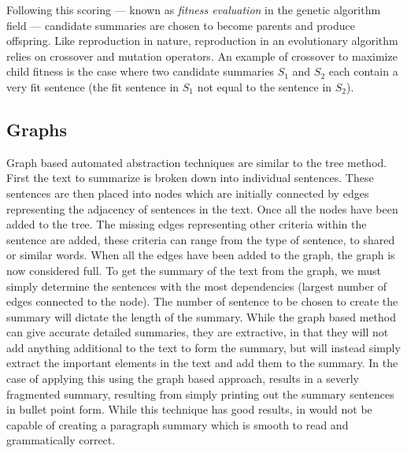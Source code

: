 Following this scoring --- known as {\em fitness evaluation} in the genetic algorithm field --- candidate summaries are chosen to become parents and produce offspring. Like reproduction in nature, reproduction in an evolutionary algorithm relies on crossover and mutation operators. An example of crossover to maximize child fitness is the case where two candidate summaries $S_1$ and $S_2$ each contain a very fit sentence (the fit sentence in $S_1$ not equal to the sentence in $S_2$).


\subsection{Graphs}
Graph based automated abstraction techniques are similar to the tree method. First the text to summarize is broken down into individual sentences. These sentences are then placed into nodes which are initially connected by edges representing the adjacency of sentences in the text. Once all the nodes have been added to the tree. The missing edges representing other criteria within the sentence are added, these criteria can range from the type of sentence, to shared or similar words. When all the edges have been added to the graph, the graph is now considered full. To get the summary of the text from the graph, we must simply determine the sentences with the most dependencies (largest number of edges connected to the node). The number of sentence to be chosen to create the summary will dictate the length of the summary. While the graph based method can give accurate detailed summaries, they are extractive, in that they will not add anything additional to the text to form the summary, but will instead simply extract the important elements in the text and add them to the summary. In the case of applying this using the graph based approach, results in a severly fragmented summary, resulting from simply printing out the summary sentences in bullet point form. While this technique has good results, in would not be capable of creating a paragraph summary which is smooth to read and grammatically correct.
